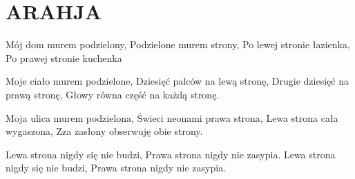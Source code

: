 \documentclass[../../../songbook.tex]{subfiles}
\begin{document}
\TabPositions{8cm} %
\section*{ARAHJA}
{}
\vspace{0.5cm}
Mój dom murem podzielony,			 \newline	
Podzielone murem strony,			 \newline	
Po lewej stronie łazienka,			 \newline	
Po prawej stronie kuchenka			 \newline	

Moje ciało murem podzielone, \newline
Dziesięć palców na lewą stronę, \newline
Drugie dziesięć na prawą stronę, \newline
Głowy równa część na każdą stronę. \newline

Moja ulica murem podzielona, \newline
Świeci neonami prawa strona, \newline
Lewa strona cała wygaszona, \newline
Zza zasłony obserwuję obie strony. \newline

Lewa strona nigdy się nie budzi, \newline
Prawa strona nigdy nie zasypia. \newline
Lewa strona nigdy się nie budzi, \newline
Prawa strona nigdy nie zasypia. \newline
\end{document}
